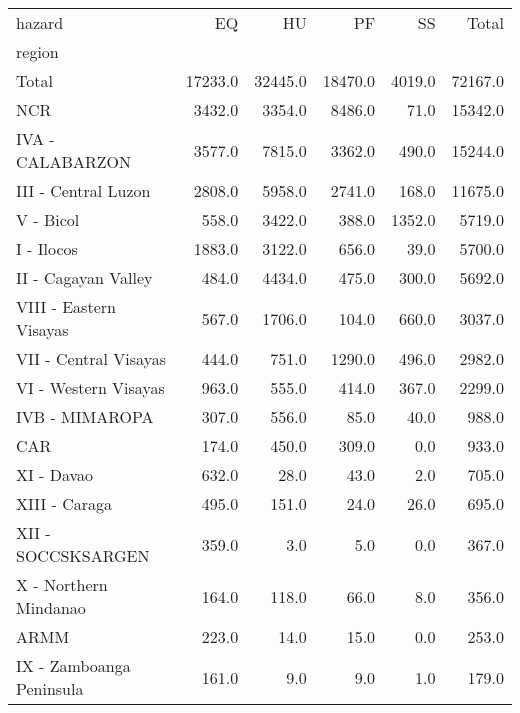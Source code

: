 \begin{tabular}{lrrrrr}
\toprule
hazard &       EQ &       HU &       PF &      SS &    Total \\
region                   &          &          &          &         &          \\
\midrule
Total                    &  17233.0 &  32445.0 &  18470.0 &  4019.0 &  72167.0 \\
NCR                      &   3432.0 &   3354.0 &   8486.0 &    71.0 &  15342.0 \\
IVA - CALABARZON         &   3577.0 &   7815.0 &   3362.0 &   490.0 &  15244.0 \\
III - Central Luzon      &   2808.0 &   5958.0 &   2741.0 &   168.0 &  11675.0 \\
V - Bicol                &    558.0 &   3422.0 &    388.0 &  1352.0 &   5719.0 \\
I - Ilocos               &   1883.0 &   3122.0 &    656.0 &    39.0 &   5700.0 \\
II - Cagayan Valley      &    484.0 &   4434.0 &    475.0 &   300.0 &   5692.0 \\
VIII - Eastern Visayas   &    567.0 &   1706.0 &    104.0 &   660.0 &   3037.0 \\
VII - Central Visayas    &    444.0 &    751.0 &   1290.0 &   496.0 &   2982.0 \\
VI - Western Visayas     &    963.0 &    555.0 &    414.0 &   367.0 &   2299.0 \\
IVB - MIMAROPA           &    307.0 &    556.0 &     85.0 &    40.0 &    988.0 \\
CAR                      &    174.0 &    450.0 &    309.0 &     0.0 &    933.0 \\
XI - Davao               &    632.0 &     28.0 &     43.0 &     2.0 &    705.0 \\
XIII - Caraga            &    495.0 &    151.0 &     24.0 &    26.0 &    695.0 \\
XII - SOCCSKSARGEN       &    359.0 &      3.0 &      5.0 &     0.0 &    367.0 \\
X - Northern Mindanao    &    164.0 &    118.0 &     66.0 &     8.0 &    356.0 \\
ARMM                     &    223.0 &     14.0 &     15.0 &     0.0 &    253.0 \\
IX - Zamboanga Peninsula &    161.0 &      9.0 &      9.0 &     1.0 &    179.0 \\
\bottomrule
\end{tabular}
